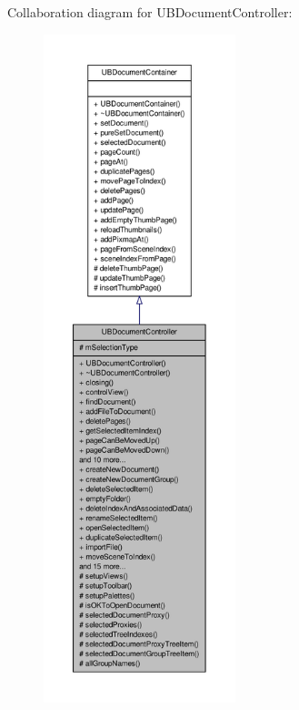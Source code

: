 Collaboration diagram for U\-B\-Document\-Controller\-:
\nopagebreak
\begin{figure}[H]
\begin{center}
\leavevmode
\includegraphics[height=550pt]{d4/d99/class_u_b_document_controller__coll__graph}
\end{center}
\end{figure}
